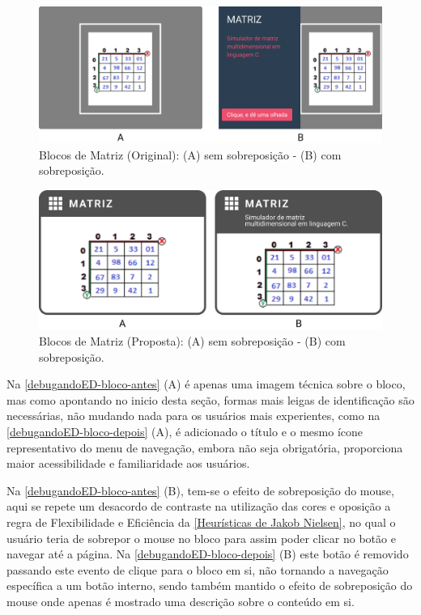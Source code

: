 \begin{figure}[htb]
    \begin{center}
	    \includegraphics[scale=0.52]{figs/debugandoED-bloco-antes.png}
	\end{center}
    \caption{\label{debugandoED-bloco-antes}Blocos de Matriz (Original): (A) sem sobreposição - (B) com sobreposição.}
\end{figure}
    
\begin{figure}[htb]
    \begin{center}
	    \includegraphics[scale=0.52]{figs/debugandoED-bloco-depois.png}
	\end{center}
        \caption{\label{debugandoED-bloco-depois}Blocos de Matriz (Proposta): (A) sem sobreposição - (B) com sobreposição.}
\end{figure}

Na \autoref{debugandoED-bloco-antes} (A) é apenas uma imagem técnica sobre o bloco, mas como apontando no inicio desta seção, formas mais leigas de identificação são necessárias, não mudando nada para os usuários mais experientes, como na \autoref{debugandoED-bloco-depois} (A), é adicionado o título e o mesmo ícone representativo do menu de navegação, embora não seja obrigatória, proporciona maior acessibilidade e familiaridade aos usuários. 

Na \autoref{debugandoED-bloco-antes} (B), tem-se o efeito de sobreposição do mouse, aqui se repete um desacordo de contraste na utilização das cores e oposição a regra de Flexibilidade e Eficiência da \autoref{Heurísticas de Jakob Nielsen}, no qual o usuário teria de sobrepor o mouse no bloco para assim poder clicar no botão e navegar até a página. Na \autoref{debugandoED-bloco-depois} (B) este botão é removido passando este evento de clique para o bloco em si, não tornando a navegação específica a um botão interno, sendo também mantido o efeito de sobreposição do mouse onde apenas é mostrado uma descrição sobre o conteúdo em si.

